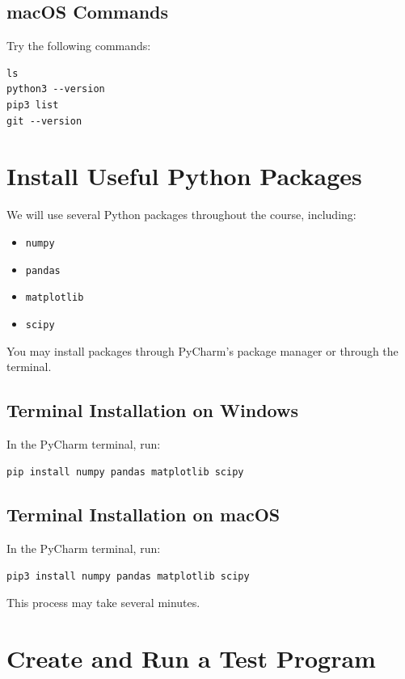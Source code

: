\documentclass[11pt]{article}
\begin{document}
\subsection*{macOS Commands}

Try the following commands:

\begin{lstlisting}[style=terminal]
ls
python3 --version
pip3 list
git --version
\end{lstlisting}

\section{Install Useful Python Packages}

We will use several Python packages throughout the course, including:

\begin{itemize}
    \item \texttt{numpy}
    \item \texttt{pandas}
    \item \texttt{matplotlib}
    \item \texttt{scipy}
\end{itemize}

You may install packages through PyCharm's package manager or through the terminal.

\subsection*{Terminal Installation on Windows}

In the PyCharm terminal, run:

\begin{lstlisting}[style=terminal]
pip install numpy pandas matplotlib scipy
\end{lstlisting}

\subsection*{Terminal Installation on macOS}

In the PyCharm terminal, run:

\begin{lstlisting}[style=terminal]
pip3 install numpy pandas matplotlib scipy
\end{lstlisting}

This process may take several minutes.

\section{Create and Run a Test Program}
\end{document}
